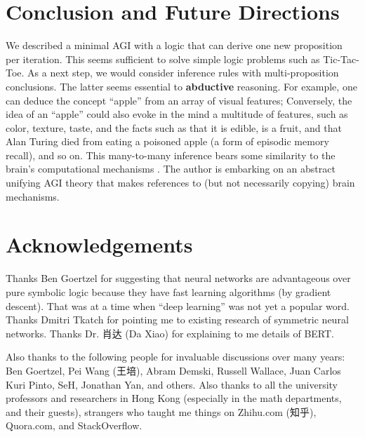 \documentclass[orivec]{llncs}
\begin{document}
\section{Conclusion and Future Directions}

We described a minimal AGI with a logic that can derive one new proposition per iteration.  This seems sufficient to solve simple logic problems such as Tic-Tac-Toe.  As a next step, we would consider inference rules with multi-proposition conclusions.  The latter seems essential to \textbf{abductive} reasoning.  For example, one can deduce the concept ``apple'' from an array of visual features;  Conversely, the idea of an ``apple'' could also evoke in the mind a multitude of features, such as color, texture, taste, and the facts such as that it is edible, is a fruit, and that Alan Turing died from eating a poisoned apple (a form of episodic memory recall), and so on.  This many-to-many inference bears some similarity to the brain's computational mechanisms \cite{Rolls2016} \cite{Rolls2021} \cite{Boraud2020}.  The author is embarking on an abstract unifying AGI theory that makes references to (but not necessarily copying) brain mechanisms.

\section*{Acknowledgements}

Thanks Ben Goertzel for suggesting that neural networks are advantageous over pure symbolic logic because they have fast learning algorithms (by gradient descent).  That was at a time when ``deep learning'' was not yet a popular word.  Thanks Dmitri Tkatch for pointing me to existing research of symmetric neural networks.  Thanks Dr. 肖达 (Da Xiao) for explaining to me details of BERT. 

Also thanks to the following people for invaluable discussions over many years:  Ben Goertzel, Pei Wang (王培), Abram Demski, Russell Wallace, Juan Carlos Kuri Pinto, SeH, Jonathan Yan, and others.  Also thanks to all the university professors and researchers in Hong Kong (especially in the math departments, and their guests), strangers who taught me things on Zhihu.com (知乎), Quora.com, and StackOverflow.


\end{document}
